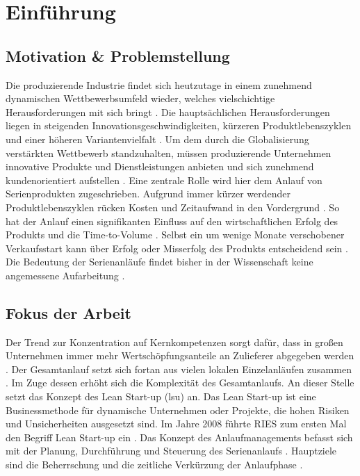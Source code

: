 \chapter{Einführung}\label{sec:einfuehrung}


\section{Motivation \& Problemstellung}
Die produzierende Industrie findet sich heutzutage in einem zunehmend dynamischen Wettbewerbsumfeld wieder, welches vielschichtige Herausforderungen mit sich bringt \cite{Renner2012}. Die hauptsächlichen Herausforderungen liegen in steigenden Innovationsgeschwindigkeiten, kürzeren Produktlebenszyklen und einer höheren Variantenvielfalt \cite{Kuhn2002,Stauder2016}. Um dem durch die Globalisierung verstärkten Wettbewerb standzuhalten, müssen produzierende Unternehmen innovative Produkte und Dienstleistungen anbieten und sich zunehmend kundenorientiert aufstellen \cite{Surbier2014}. 
Eine zentrale Rolle wird hier dem Anlauf von Serienprodukten zugeschrieben. Aufgrund immer kürzer werdender Produktlebenszyklen rücken Kosten und Zeitaufwand in den Vordergrund \cite{Winkler2007}. So hat der Anlauf einen signifikanten Einfluss auf den wirtschaftlichen Erfolg des Produkts und die Time-to-Volume \cite{Klocke16}. Selbst ein um wenige Monate verschobener Verkaufsstart kann über Erfolg oder Misserfolg des Produkts entscheidend sein \cite{Schuh2008a}. Die Bedeutung der Serienanläufe findet bisher in der Wissenschaft keine angemessene Aufarbeitung \cite{Dyckhoff2012}. 

\section{Fokus der Arbeit}

Der Trend zur Konzentration auf Kernkompetenzen sorgt dafür, dass in großen Unternehmen immer mehr Wertschöpfungsanteile an Zulieferer abgegeben werden  \cite{Hilmola2015, Wildemann2008}. Der Gesamtanlauf setzt sich fortan aus vielen lokalen Einzelanläufen zusammen \cite{Zimolong2006}. Im Zuge dessen erhöht sich die Komplexität des Gesamtanlaufs. An dieser Stelle setzt das Konzept des Lean Start-up (\gls{lsu}) an. Das Lean Start-up ist eine Businessmethode für dynamische Unternehmen oder Projekte, die hohen Risiken und Unsicherheiten ausgesetzt sind. %
Im Jahre 2008 führte RIES zum ersten Mal den Begriff Lean Start-up ein \cite{Ries2008}. 
Das Konzept des Anlaufmanagements befasst sich mit der Planung, Durchführung und Steuerung des Serienanlaufs \cite[S.8]{Kuhn2002}. Hauptziele sind die Beherrschung und die zeitliche Verkürzung der Anlaufphase \cite{Kuhn2002, Schmitt2015}.

